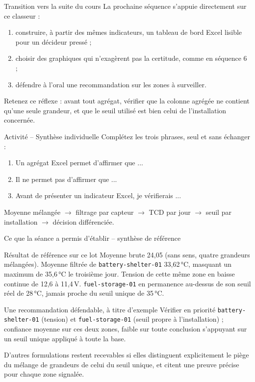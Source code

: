 \documentclass[aspectratio=169]{beamer}
\begin{document}
\begin{frame}{Transition vers la suite du cours}
  La prochaine séquence s'appuie directement sur ce classeur :
  \begin{enumerate}
    \item construire, à partir des mêmes indicateurs, un tableau de bord Excel lisible pour un décideur pressé ;
    \item choisir des graphiques qui n'exagèrent pas la certitude, comme en séquence 6 ;
    \item défendre à l'oral une recommandation sur les zones à surveiller.
  \end{enumerate}
  \vfill
  Retenez ce réflexe : avant tout agrégat, vérifier que la colonne agrégée ne contient qu'une seule grandeur, et que le seuil utilisé est bien celui de l'installation concernée.
\end{frame}

\begin{frame}{Activité -- Synthèse individuelle}
  Complétez les trois phrases, seul et sans échanger :
  \begin{enumerate}
    \item Un agrégat Excel permet d'affirmer que ...
    \item Il ne permet pas d'affirmer que ...
    \item Avant de présenter un indicateur Excel, je vérifierais ...
  \end{enumerate}
  \vfill
  \alert{Moyenne mélangée $\rightarrow$ filtrage par capteur $\rightarrow$ TCD par jour $\rightarrow$ seuil par installation $\rightarrow$ décision différenciée.}
\end{frame}

\begin{frame}{Ce que la séance a permis d'établir -- synthèse de référence}
  \small
  \begin{block}{Résultat de référence sur ce lot}
    Moyenne brute 24,05 (sans sens, quatre grandeurs mélangées). Moyenne filtrée de \texttt{battery-shelter-01} 33,62\,°C, masquant un maximum de 35,6\,°C le troisième jour. Tension de cette même zone en baisse continue de 12,6 à 11,4\,V. \texttt{fuel-storage-01} en permanence au-dessus de son seuil réel de 28\,°C, jamais proche du seuil unique de 35\,°C.
  \end{block}
  \begin{block}{Une recommandation défendable, à titre d'exemple}
    Vérifier en priorité \texttt{battery-shelter-01} (tension) et \texttt{fuel-storage-01} (seuil propre à l'installation) ; confiance moyenne sur ces deux zones, faible sur toute conclusion s'appuyant sur un seuil unique appliqué à toute la base.
  \end{block}
  \normalsize
  \alert{D'autres formulations restent recevables si elles distinguent explicitement le piège du mélange de grandeurs de celui du seuil unique, et citent une preuve précise pour chaque zone signalée.}
\end{frame}
\end{document}
